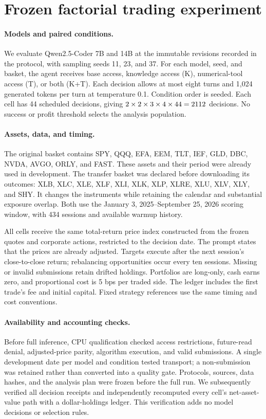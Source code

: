 \section{Frozen factorial trading experiment}
\label{sec:factorial}
\paragraph{Models and paired conditions.}
We evaluate Qwen2.5-Coder 7B and 14B at the immutable revisions recorded in the protocol,
with sampling seeds 11, 23, and 37. For each model, seed, and basket, the agent receives
base access, knowledge access (K), numerical-tool access (T), or both (K+T). Each decision
allows at most eight turns and 1,024 generated tokens per turn at temperature 0.1.
Condition order is seeded. Each cell has 44 scheduled decisions, giving
$2\times2\times3\times4\times44=2112$ decisions. No success or profit threshold
selects the analysis population.

\paragraph{Assets, data, and timing.}
The original basket contains SPY, QQQ, EFA, EEM, TLT, IEF, GLD, DBC, NVDA, AVGO, ORLY,
and FAST. These assets and their period were already used in development. The transfer
basket was declared before downloading its outcomes: XLB, XLC, XLE, XLF, XLI, XLK, XLP,
XLRE, XLU, XLV, XLY, and SHY. It changes the instruments while retaining the calendar
and substantial exposure overlap. Both use the January 3, 2025--September 25, 2026
scoring window, with 434 sessions and available warmup history.

All cells receive the same total-return price index constructed from the frozen quotes
and corporate actions, restricted to the decision date. The prompt states that the
prices are already adjusted. Targets execute after the next session's close-to-close
return; rebalancing opportunities occur every ten sessions. Missing or invalid submissions
retain drifted holdings. Portfolios are long-only, cash earns zero, and proportional
cost is 5 bps per traded side. The ledger includes the first trade's fee and initial
capital. Fixed strategy references use the same timing and cost conventions.

\paragraph{Availability and accounting checks.}
Before full inference, CPU qualification checked access restrictions, future-read denial,
adjusted-price parity, algorithm execution, and valid submissions. A single development
date per model and condition tested transport; a non-submission was retained rather
than converted into a quality gate. Protocols, sources, data hashes, and the analysis
plan were frozen before the full run. We subsequently verified all decision receipts
and independently recomputed every cell's net-asset-value path with a dollar-holdings
ledger. This verification adds no model decisions or selection rules.


